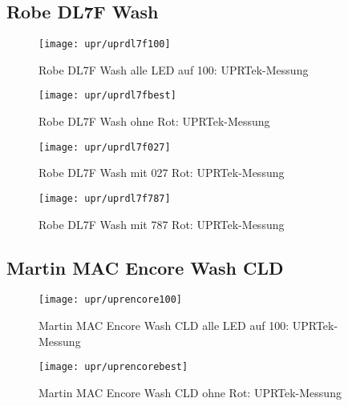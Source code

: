 \documentclass[pagesize,paper=A4,fontsize=12pt,utf8,numbers=noenddot,bibliography=totoc,listof=totoc,DIV=11,BCOR=1mm]{scrreprt}
\begin{document}
\subsection{Robe DL7F Wash}

\begin{figure}[htp]     %
\centering
\texttt{[image: upr/uprdl7f100]} 
\caption {Robe DL7F Wash alle LED auf 100: UPRTek-Messung} 
\end{figure}

\begin{figure}[htp]     %
\centering
\texttt{[image: upr/uprdl7fbest]} 
\caption {Robe DL7F Wash ohne Rot: UPRTek-Messung} 
\end{figure}

\begin{figure}[htp]     %
\centering
\texttt{[image: upr/uprdl7f027]} 
\caption {Robe DL7F Wash mit 027 Rot: UPRTek-Messung} 
\end{figure}

\begin{figure}[htp]     %
\centering
\texttt{[image: upr/uprdl7f787]} 
\caption {Robe DL7F Wash mit 787 Rot: UPRTek-Messung} 
\end{figure}


\subsection{Martin MAC Encore Wash CLD}

\begin{figure}[htp]     %
\centering
\texttt{[image: upr/uprencore100]} 
\caption {Martin MAC Encore Wash CLD alle LED auf 100: UPRTek-Messung} 
\end{figure}

\begin{figure}[htp]     %
\centering
\texttt{[image: upr/uprencorebest]} 
\caption {Martin MAC Encore Wash CLD ohne Rot: UPRTek-Messung} 
\end{figure}
\end{document}
